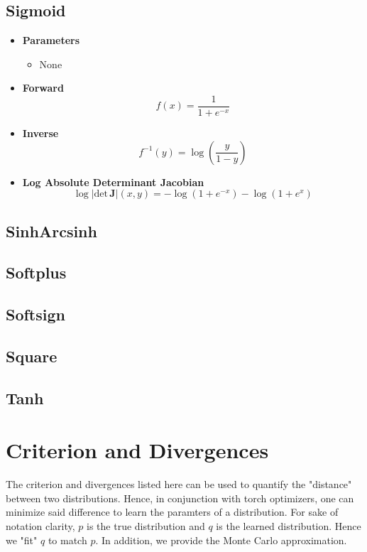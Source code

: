 \documentclass{article}
\begin{document}
\subsection{Sigmoid}
\begin{itemize}
  \item \textbf{Parameters}
  \begin{itemize}
    \item None
  \end{itemize}
  \item \textbf{Forward}
  \begin{equation}
    f(x) = \frac{1}{1 + e^{-x}}
  \end{equation}
  \item \textbf{Inverse}
  \begin{equation}
    f^{-1}(y) = \log \left( \frac{y}{1 - y} \right)
  \end{equation}
  \item \textbf{Log Absolute Determinant Jacobian}
  \begin{equation}
    \log \vert \text{det} \, \mathbf{J} \vert (x, y) = -\log\left( 1 + e^{-x} \right) - \log\left( 1 + e^{x} \right)
  \end{equation}
\end{itemize}
\subsection{SinhArcsinh}
\subsection{Softplus}
\subsection{Softsign}
\subsection{Square}
\subsection{Tanh}

\section{Criterion and Divergences}
The criterion and divergences listed here can be used to quantify the "distance"
between two distributions. Hence, in conjunction with torch optimizers,
one can minimize said difference to learn the paramters of a distribution. For
sake of notation clarity, $p$ is the true distribution and $q$ is the learned
distribution. Hence we "fit" $q$ to match $p$. In addition, we provide the
Monte Carlo approximation.
\end{document}
